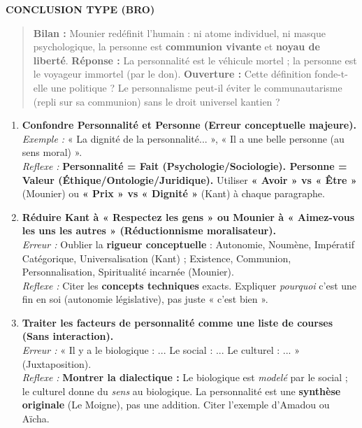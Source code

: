 \documentclass[11pt]{article}
\begin{document}
\begin{exoresolu}
\textbf{CONCLUSION TYPE (BRO)}
\begin{quote}
\textbf{Bilan :} Mounier redéfinit l'humain : ni atome individuel, ni masque psychologique, la personne est \textbf{communion vivante} et \textbf{noyau de liberté}. \textbf{Réponse :} La personnalité est le véhicule mortel ; la personne est le voyageur immortel (par le don). \textbf{Ouverture :} Cette définition fonde-t-elle une politique ? Le personnalisme peut-il éviter le communautarisme (repli sur sa communion) sans le droit universel kantien ?
\end{quote}
\end{exoresolu}

\begin{attention}
\begin{enumerate}
    \item \textbf{Confondre Personnalité et Personne (Erreur conceptuelle majeure).} \\
    \textit{Exemple :} « La dignité de la personnalité... », « Il a une belle personne (au sens moral) ». \\
    \textit{Reflexe :} \textbf{Personnalité = Fait (Psychologie/Sociologie). Personne = Valeur (Éthique/Ontologie/Juridique).} Utiliser \textbf{« Avoir » vs « Être »} (Mounier) ou \textbf{« Prix » vs « Dignité »} (Kant) à chaque paragraphe.
    
    \item \textbf{Réduire Kant à « Respectez les gens » ou Mounier à « Aimez-vous les uns les autres » (Réductionnisme moralisateur).} \\
    \textit{Erreur :} Oublier la \textbf{rigueur conceptuelle} : Autonomie, Noumène, Impératif Catégorique, Universalisation (Kant) ; Existence, Communion, Personnalisation, Spiritualité incarnée (Mounier). \\
    \textit{Reflexe :} Citer les \textbf{concepts techniques} exacts. Expliquer \emph{pourquoi} c'est une fin en soi (autonomie législative), pas juste « c'est bien ».
    
    \item \textbf{Traiter les facteurs de personnalité comme une liste de courses (Sans interaction).} \\
    \textit{Erreur :} « Il y a le biologique : ... Le social : ... Le culturel : ... » (Juxtaposition). \\
    \textit{Reflexe :} \textbf{Montrer la dialectique :} Le biologique est \emph{modelé} par le social ; le culturel donne du \emph{sens} au biologique. La personnalité est une \textbf{synthèse originale} (Le Moigne), pas une addition. Citer l'exemple d'Amadou ou Aïcha.
    

\end{enumerate}
\end{attention}
\end{document}
